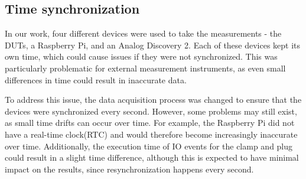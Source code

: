 \subsection{Time synchronization}
In our work, four different devices were used to take the measurements - the DUTs, a Raspberry Pi, and an Analog Discovery 2. Each of these devices kept its own time, which could cause issues if they were not synchronized. This was particularly problematic for external measurement instruments, as even small differences in time could result in inaccurate data.

To address this issue, the data acquisition process was changed to ensure that the devices were synchronized every second. However, some problems may still exist, as small time drifts can occur over time. For example, the Raspberry Pi did not have a real-time clock(RTC)\cite{RTCRasp} and would therefore become increasingly inaccurate over time. Additionally, the execution time of IO events for the clamp and plug could result in a slight time difference, although this is expected to have minimal impact on the results, since resynchronization happens every second.


